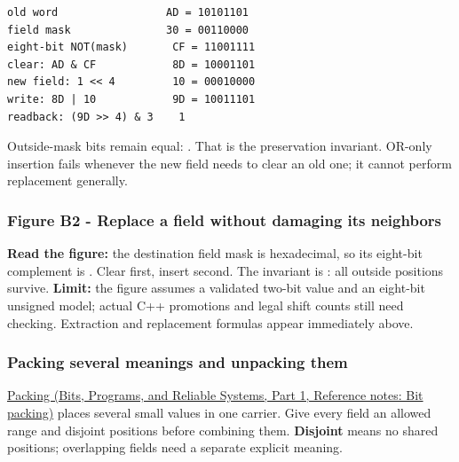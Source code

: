 \begin{verbatim}
old word                 AD = 10101101
field mask               30 = 00110000
eight-bit NOT(mask)       CF = 11001111
clear: AD & CF            8D = 10001101
new field: 1 << 4         10 = 00010000
write: 8D | 10            9D = 10011101
readback: (9D >> 4) & 3    1
\end{verbatim}

Outside-mask bits remain equal: . That is the preservation invariant. OR-only insertion fails whenever the new field needs to clear an old one; it cannot perform replacement generally.

\subsubsection{Figure B2 - Replace a field without damaging its neighbors}\label{05-engine-i-ch001-figure-b2---replace-a-field-without-damaging-its-neighbors}

\hypertarget{05-engine-i-ch001-figure-b2---replace-a-field-without-damaging-its-neighbors}{}


\textbf{Read the figure:} the destination field mask is  hexadecimal, so its eight-bit complement is . Clear first, insert second. The invariant is : all outside positions survive. \textbf{Limit:} the figure assumes a validated two-bit value and an eight-bit unsigned model; actual C++ promotions and legal shift counts still need checking. Extraction and replacement formulas appear immediately above.

\subsubsection{Packing several meanings and unpacking them}\label{05-engine-i-ch001-packing-several-meanings-and-unpacking-them}

\hypertarget{05-engine-i-ch001-packing-several-meanings-and-unpacking-them}{}

\href{../01-Bits-Programs-and-Reliable-Systems-P01/main.pdf\#appendix-1f9963e1a5d1}{Packing (Bits, Programs, and Reliable Systems, Part 1, Reference notes: Bit packing)} places several small values in one carrier. Give every field an allowed range and disjoint positions before combining them. \textbf{Disjoint} means no shared positions; overlapping fields need a separate explicit meaning.

